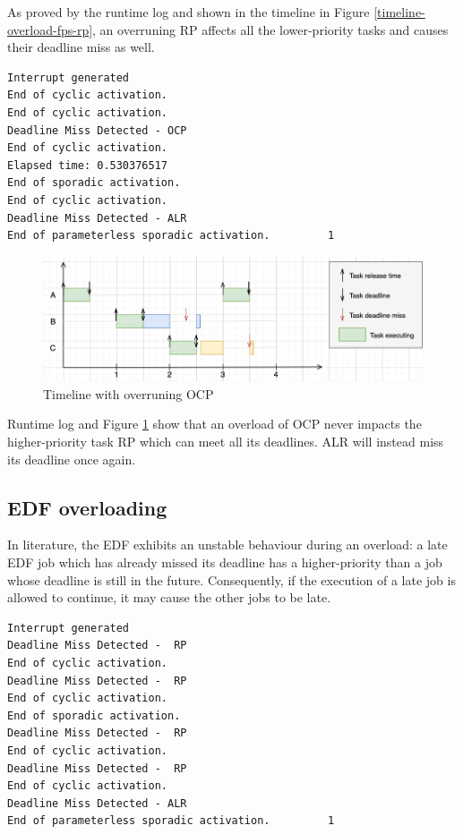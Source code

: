 \documentclass{article}
\begin{document}
As proved by the runtime log and shown in the timeline in Figure \ref{timeline-overload-fps-rp}, an overruning RP affects all the lower-priority tasks and causes their deadline miss as well.

\begin{lstlisting}
Interrupt generated
End of cyclic activation.
End of cyclic activation.
Deadline Miss Detected - OCP
End of cyclic activation.
Elapsed time: 0.530376517
End of sporadic activation.
End of cyclic activation.
Deadline Miss Detected - ALR
End of parameterless sporadic activation.         1
\end{lstlisting}

\begin{figure}[!htbp]
\centering
\includegraphics[width=6.5in]{images/timeline-overload-fps-ocp}
\caption{Timeline with overruning OCP}
\label{timeline-overload-fps-ocp}
\end{figure}

Runtime log and Figure \ref{timeline-overload-fps-ocp} show that an overload of OCP never impacts the higher-priority task RP which can meet all its deadlines. ALR will instead miss its deadline once again.

\subsection{EDF overloading}

In literature, the EDF exhibits an unstable behaviour during an overload: a late EDF job which has already missed its deadline has a higher-priority than a job whose deadline is still in the future. Consequently, if the execution of a late job is allowed to continue, it may cause the other jobs to be late.

\begin{lstlisting}
Interrupt generated
Deadline Miss Detected -  RP
End of cyclic activation.
Deadline Miss Detected -  RP
End of cyclic activation.
End of sporadic activation.
Deadline Miss Detected -  RP
End of cyclic activation.
Deadline Miss Detected -  RP
End of cyclic activation.
Deadline Miss Detected - ALR
End of parameterless sporadic activation.         1
\end{lstlisting}
\end{document}
